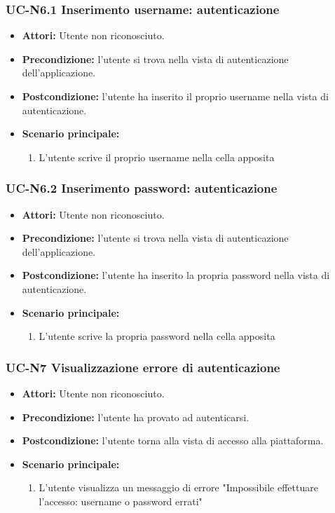 		

\subsubsection{UC-N6.1 Inserimento username: autenticazione}
\begin{itemize}
	\item \textbf{Attori:} Utente non riconosciuto.
			\item \textbf{Precondizione:} l'utente si trova nella vista di autenticazione dell'applicazione.
			\item \textbf{Postcondizione:} l'utente ha inserito il proprio username nella vista di autenticazione.
			\item \textbf{Scenario principale:}
				\begin{enumerate}
					\item L'utente scrive il proprio username nella cella apposita
				\end{enumerate}
\end{itemize}

\subsubsection{UC-N6.2 Inserimento password: autenticazione}
\begin{itemize}
	\item \textbf{Attori:} Utente non riconosciuto.
			\item \textbf{Precondizione:} l'utente si trova nella vista di autenticazione dell'applicazione.
			\item \textbf{Postcondizione:} l'utente ha inserito la propria password nella vista di autenticazione.
			\item \textbf{Scenario principale:}
				\begin{enumerate}
					\item L'utente scrive la propria password nella cella apposita
				\end{enumerate}
\end{itemize}
		
\subsubsection{UC-N7 Visualizzazione errore di autenticazione}
		\begin{itemize}
			\item \textbf{Attori:} Utente non riconosciuto.
			\item \textbf{Precondizione:} l'utente ha provato ad autenticarsi.
			\item \textbf{Postcondizione:} l'utente torna alla vista di accesso alla piattaforma.
			\item \textbf{Scenario principale:}
			\begin{enumerate}
				\item L'utente visualizza un messaggio di errore "Impossibile effettuare l'accesso: username o password errati"
			\end{enumerate}
		\end{itemize}
		
